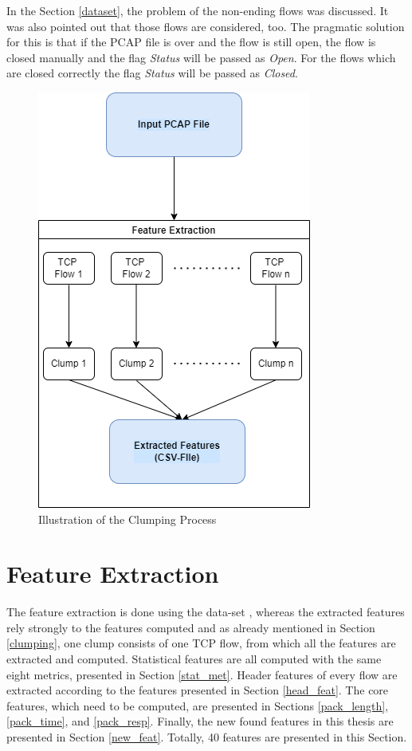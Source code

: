 In the Section \ref{dataset}, the problem of the non-ending flows was discussed. It was also pointed out that those flows are considered, too. The pragmatic solution for this is that if the PCAP file is over and the flow is still open, the flow is closed manually and the flag \textit{Status} will be passed as \textit{Open}. For the flows which are closed correctly the flag \textit{Status} will be passed as \textit{Closed}.

\begin{figure} [h]
\includegraphics[scale=0.45]{images/clumping.png}
\centering
\caption{Illustration of the Clumping Process}
\label{fig:clumping}
\end{figure}

\section{Feature Extraction} \label{feature_extraction_design}
The feature extraction is done using the data-set \cite{CIRA-CIC-DoHBrw-2020}, whereas the extracted features rely strongly to the features \cite{montazerishatoori2020anomaly} computed and as already mentioned in Section \ref{clumping}, one clump consists of one TCP flow, from which all the features are extracted and computed. Statistical features are all computed with the same eight metrics, presented in Section \ref{stat_met}. Header features of every flow are extracted according to the features presented in Section \ref{head_feat}. The core features, which need to be computed, are presented in Sections \ref{pack_length}, \ref{pack_time}, and \ref{pack_resp}. Finally, the new found features in this thesis are presented in Section \ref{new_feat}. Totally, 40 features are presented in this Section.

